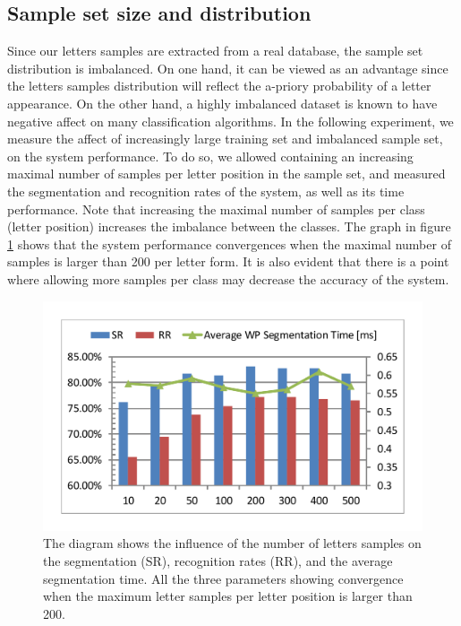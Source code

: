 \documentclass[10pt, conference, compsocconf]{IEEEtran}
\begin{document}
\subsection{Sample set size and distribution}
Since our letters samples are extracted from a real database, the sample set distribution is imbalanced. 
On one hand, it can be viewed as an advantage since the letters samples distribution will reflect the a-priory probability of a letter appearance. 
On the other hand, a highly imbalanced dataset is known to have negative affect on many classification algorithms.
In the following experiment, we measure the affect of increasingly large training set and imbalanced sample set, on the system performance.
To do so, we allowed containing an increasing maximal number of samples per letter position in the sample set, and measured the segmentation and recognition rates of the system, as well as its time performance. 
Note that increasing the maximal number of samples per class (letter position) increases the imbalance between the classes. 
The graph in figure \ref{fig:num_letter_impact} shows that the system performance convergences when the maximal number of samples is larger than 200 per letter form. 
It is also evident that there is a point where allowing more samples per class may decrease the accuracy of the system.

\begin{figure}
\centering
\includegraphics[width=1\columnwidth]{./figures/num_letter_impact}
\caption{The diagram shows the influence of the number of letters samples on the segmentation (SR), recognition rates (RR), and the average segmentation time. All the three parameters showing convergence when the maximum letter samples per letter position is larger than 200. }
\label{fig:num_letter_impact}
\end{figure}
\end{document}
